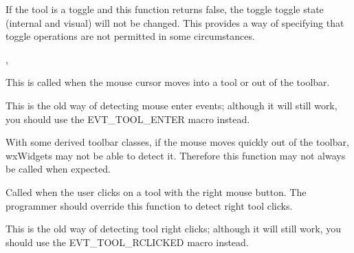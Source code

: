 

If the tool is a toggle and this function returns false, the toggle
toggle state (internal and visual) will not be changed. This provides a way of
specifying that toggle operations are not permitted in some circumstances.


,\rtfsp
{}

\label{wxtoolbaronmouseenter}


This is called when the mouse cursor moves into a tool or out of
the toolbar.

This is the old way of detecting mouse enter events; although it will still work,
you should use the EVT\_TOOL\_ENTER macro instead.




With some derived toolbar classes, if the mouse moves quickly out of the toolbar, wxWidgets may not be able to
detect it. Therefore this function may not always be called when expected.

\label{wxtoolbaronrightclick}


Called when the user clicks on a tool with the right mouse button. The
programmer should override this function to detect right tool clicks.

This is the old way of detecting tool right clicks; although it will still work,
you should use the EVT\_TOOL\_RCLICKED macro instead.



